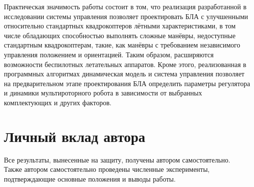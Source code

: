 Практическая значимость работы состоит в том, что
реализация разработанной в исследовании системы управления позволяет проектировать БЛА с улучшенными относительно стандартных квадрокоптеров лётными характеристиками, в том числе обладающих способностью 
выполнять сложные манёвры, недоступные стандартным квадрокоптерам, такие, как манёвры с требованием независимого управления положением и ориентацией.
Таким образом, расширяются возможности беспилотных летательных аппаратов.
Кроме этого, реализованная в программных алгоритмах динамическая модель и система управления позволяет на предварительном этапе проектирования БЛА определить параметры регулятора и динамики мультироторного робота в зависимости от выбранных комплектующих и других факторов.

\section{Личный вклад автора}
Все результаты, вынесенные на защиту, получены автором самостоятельно.
Также автором самостоятельно проведены численные эксперименты,
подтверждающие основные положения и выводы работы.